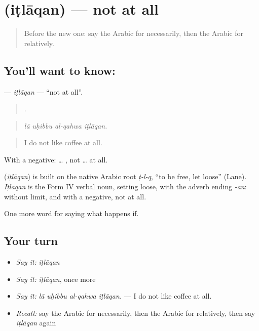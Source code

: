 \section[\texorpdfstring{\ar{إطلاقا} (iṭlāqan)}{إطلاقا (iṭlāqan)}]{ (iṭlāqan) — not at all}

\label{lesson:AR-C402-itlaqan}



\begin{quote}
Before the new one: say the Arabic for necessarily, then the Arabic for relatively.
\end{quote}

\subsection*{You'll want to know: }
\textbf{} — \emph{iṭlāqan} — \textquotedblleft{}not at all\textquotedblright{}.

\begin{quote}
   .
\end{quote}

\begin{quote}
\emph{lā uḥibbu al-qahwa iṭlāqan.}
\end{quote}

\begin{quote}
I do not like coffee at all.
\end{quote}

With a negative:  … , not … at all.

\begin{cousinweb}
\textbf{} (\emph{iṭlāqan}) is built on the native Arabic root \emph{ṭ-l-q}, \textquotedblleft{}to be free, let loose\textquotedblright{} (Lane). \emph{Iṭlāqan} is the Form IV verbal noun, setting loose, with the adverb ending \emph{-an}: without limit, and with a negative, not at all.
\end{cousinweb}

\begin{grammarlens}[title={What you've built}]
One more word for saying what happens if.
\end{grammarlens}

\subsection*{Your turn}
\begin{itemize}
\raggedright
  \item \emph{Say it:} \emph{iṭlāqan}
  \item \emph{Say it:} \emph{iṭlāqan}, once more
  \item \emph{Say it:} \emph{lā uḥibbu al-qahwa iṭlāqan.} — I do not like coffee at all.
  \item \emph{Recall:} say the Arabic for necessarily, then the Arabic for relatively, then say \emph{iṭlāqan} again
\end{itemize}

